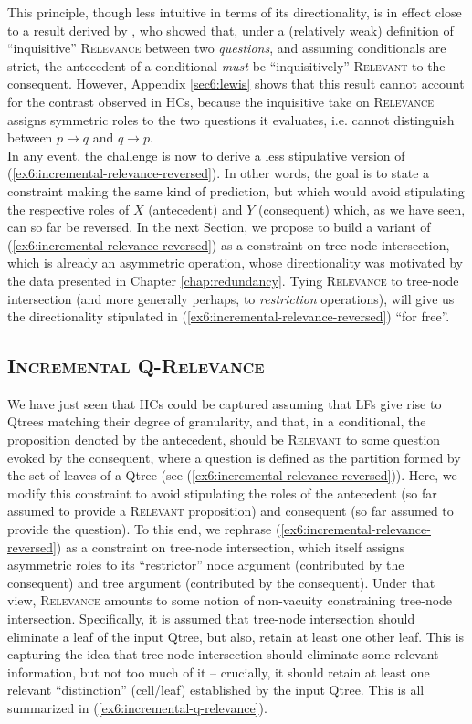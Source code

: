 This principle, though less intuitive in terms of its directionality, is in effect close to a result derived by \textcite{Lewis1988}, who showed that, under a (relatively weak) definition of ``inquisitive'' \textsc{Relevance} between two \textit{questions}, and assuming conditionals are strict, the antecedent of a conditional \textit{must} be ``inquisitively'' \textsc{Relevant} to the consequent. However, Appendix \ref{sec6:lewis} shows that this result cannot account for the contrast observed in HCs, because the inquisitive take on \textsc{Relevance} assigns symmetric roles to the two questions it evaluates, i.e. cannot distinguish between $p \rightarrow q$ and $q \rightarrow p$.\\

In any event, the challenge is now to derive a less stipulative version of (\ref{ex6:incremental-relevance-reversed}). In other words, the goal is to state a constraint making the same kind of prediction, but which would avoid stipulating the respective roles of $X$ (antecedent) and $Y$ (consequent) which, as we have seen, can so far be reversed. In the next Section, we propose to build a variant of (\ref{ex6:incremental-relevance-reversed}) as a constraint on tree-node intersection, which is already an asymmetric operation, whose directionality was motivated by the data presented in Chapter \ref{chap:redundancy}. Tying \textsc{Relevance} to tree-node intersection (and more generally perhaps, to \textit{restriction} operations), will give us the directionality stipulated in (\ref{ex6:incremental-relevance-reversed}) ``for free''.

\subsection{\textsc{Incremental Q-Relevance}}

We have just seen that HCs could be captured assuming that LFs give rise to Qtrees matching their degree of granularity, and that, in a conditional, the proposition denoted by the antecedent, should be \textsc{Relevant} to some question evoked by the consequent, where a question is defined as the partition formed by the set of leaves of a Qtree (see (\ref{ex6:incremental-relevance-reversed})). Here, we modify this constraint to avoid stipulating the roles of the antecedent (so far assumed to provide a \textsc{Relevant} proposition) and consequent (so far assumed to provide the question). To this end, we rephrase (\ref{ex6:incremental-relevance-reversed}) as a constraint on tree-node intersection, which itself assigns asymmetric roles to its ``restrictor'' node argument (contributed by the consequent) and tree argument (contributed by the consequent). Under that view, \textsc{Relevance} amounts to some notion of non-vacuity constraining tree-node intersection. Specifically, it is assumed that tree-node intersection should eliminate a leaf of the input Qtree, but also, retain at least one other leaf. This is capturing the idea that tree-node intersection should eliminate some relevant information, but not too much of it -- crucially, it should retain at least one relevant ``distinction'' (cell/leaf) established by the input Qtree. This is all summarized in (\ref{ex6:incremental-q-relevance}).



